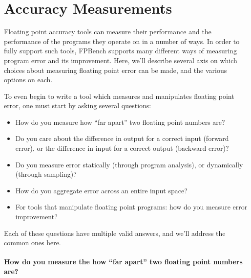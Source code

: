 \documentclass[main.tex]{subfiles}
\begin{document}
\section{Accuracy Measurements}
\label{sec:measure}

Floating point accuracy tools can measure their performance and the
performance of the programs they operate on in a number of ways. In
order to fully support such tools, FPBench supports many different
ways of measuring program error and its improvement. Here, we'll
describe several axis on which choices about measuring floating point
error can be made, and the various options on each.

To even begin to write a tool which measures and manipulates floating
point error, one must start by asking several questions:

\begin{itemize}
\item How do you measure how ``far apart''  two floating point
  numbers are?
\item Do you care about the difference in output for a correct input
  (forward error), or the difference in input for a correct output
  (backward error)?
\item Do you measure error statically (through program analysis), or
  dynamically (through sampling)?
\item How do you aggregate error across an entire input space?
\item For tools that manipulate floating point programs: how do you
  measure error improvement?
\end{itemize}

Each of these questions have multiple valid answers, and we'll address
the common ones here.

\paragraph{How do you measure the how ``far apart'' two floating point numbers are?}
\end{document}
